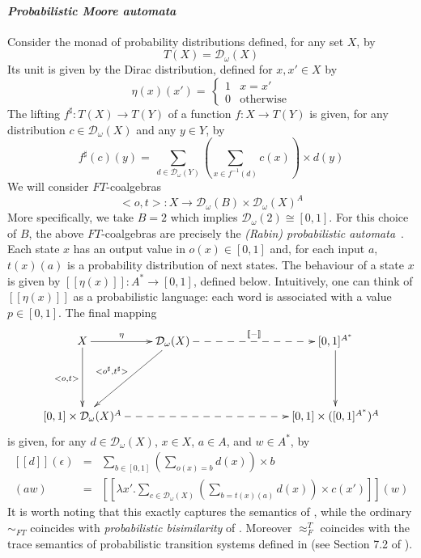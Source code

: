 \documentclass{LMCS}
\newcommand{\bb}[1]{[\![ #1 ]\!]}
\begin{document}
\paragraph{\em Probabilistic Moore automata}
Consider the monad of probability distributions defined,
for any set $X$, by
\[
T(X) =\mathcal D_\omega(X)
\]
Its unit is given by the Dirac distribution, defined for $x,x' \in X$ by
\[
\eta(x)(x') = \,
\begin{cases} 1 & x=x' \\ 0 &\text{otherwise}\end{cases}
\]
The lifting $f^\sharp \colon T(X) \to T(Y)$
of a function $f\colon X\to T(Y)$ is given,
for any distribution $c \in \mathcal D_\omega(X)$
and any $y \in Y$,  by
\[
f^\sharp(c)(y) = \,  \sum_{d\in \mathcal D_\omega(Y)} \left(\sum_{x\in
f^{-1}(d)} c(x)\right)\times
d(y)
\]
We will consider $FT$-coalgebras
\[
<o,t> \colon X \to  \mathcal
D_\omega(B) \times \mathcal
D_\omega(X)^A
\]
More specifically, we take $B=2$ which implies $\mathcal D_\omega(2) \cong
[0,1]$. For this choice of $B$, the above $FT$-coalgebras are precisely
the \emph{(Rabin) probabilistic
automata}~\cite{rabin}.
Each state $x$ has an output value in $o(x) \in [0,1]$ and, for each
input $a$, $t(x)(a)$ is a probability distribution of next states. The
behaviour of a state $x$ is given by $\bb{\eta(x)}\colon A^* \to
[0,1]$, defined below. Intuitively, one can think of $\bb{\eta(x)}$
as a probabilistic language: each word is associated with a value
$p\in[0,1]$.
The final mapping
\[
\xymatrix@R=0.75cm{
X \ar[dd]_{<o,t>}\ar@{->}[r]^-{\eta}&
\mathcal D_\omega(X)
\ar[ddl]_-{<o^\sharp,t^\sharp>}\ar@{-->}[rrr]^{\bb-}
&&&
[0,1]^{A^*}\ar[dd]\\\\
[0,1] \times \mathcal D_\omega(X)^A \ar@{-->}[rrrr] &&&&
[0,1] \times ([0,1]^{A^*})^A
}
\]
is given, for any $d \in \mathcal D_\omega(X)$, $x\in X$, $a \in A$,
and $w \in A^*$, by
\[
\begin{array}{lcl}
\bb{d} (\epsilon) &=& \sum\limits_{b\in[0,1]}(\sum\limits_{o(x) = b}
d(x))\times b\\
\bb{d} (aw) &=& \bb{\lambda x' . \sum\limits_{c\in
\mathcal D_\omega(X)} (\sum_{b=t(x)(a)} d(x)) \times  c(x')} (w)
\end{array}
\]
It is worth noting that this exactly captures the semantics of
\cite{rabin}, while the ordinary $\sim_{FT}$ coincides with
\emph{probabilistic bisimilarity} of \cite{LarsenS91}.
Moreover $\approx_F^T$ coincides 
with the trace semantics of probabilistic transition systems defined in \cite{HJS} (see Section 7.2 of \cite{JSS}). 
\end{document}
